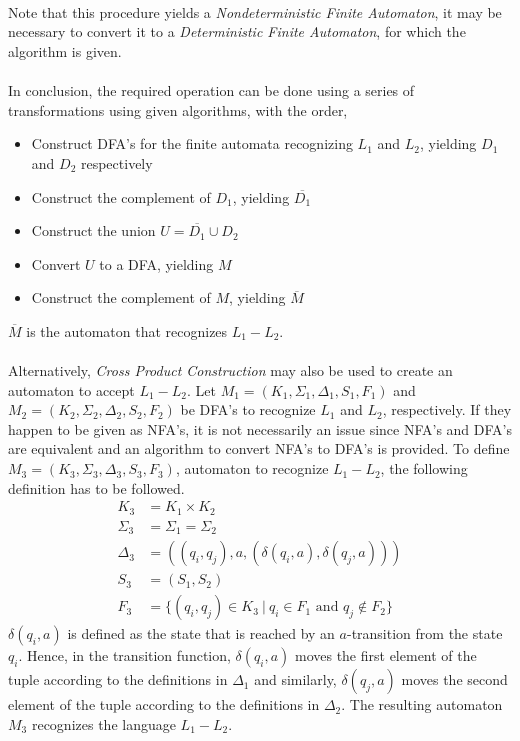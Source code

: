 \documentclass[12pt]{article}
\begin{document}
~\\
\\~\\
Note that this procedure yields a \textit{Nondeterministic Finite Automaton}, it may be necessary to convert it to a \textit{Deterministic Finite Automaton}, for which the algorithm is given.\\~\\
In conclusion, the required operation can be done using a series of transformations using given algorithms, with the order,
\begin{itemize}
    \item Construct DFA's for the finite automata recognizing $L_1$ and $L_2$, yielding $D_1$ and $D_2$ respectively
    \item Construct the complement of $D_1$, yielding $\overline{D_1}$
    \item Construct the union $U=\overline{D_1}\cup D_2$
    \item Convert $U$ to a DFA, yielding $M$
    \item Construct the complement of $M$, yielding $\overline M$
\end{itemize}
$\overline M$ is the automaton that recognizes $L_1-L_2$.\\~\\
Alternatively, \textit{Cross Product Construction} may also be used to create an automaton to accept $L_1-L_2$. Let $M_1=(K_1,\Sigma_1,\Delta_1,S_1,F_1)$ and $M_2=(K_2,\Sigma_2,\Delta_2,S_2,F_2)$ be DFA's to recognize $L_1$ and $L_2$, respectively. If they happen to be given as NFA's, it is not necessarily an issue since NFA's and DFA's are equivalent and an algorithm to convert NFA's to DFA's is provided. To define $M_3=(K_3,\Sigma_3,\Delta_3,S_3,F_3)$, automaton to recognize $L_1-L_2$, the following definition has to be followed.\\
\begin{align*}
    K_3 &= K_1 \times K_2 \\
    \Sigma_3 &= \Sigma_1 = \Sigma_2\\
    \Delta_3 &= ((q_i,q_j), a, (\delta(q_i,a),\delta(q_j,a)))\\
    S_3 &= (S_1,S_2)\\
    F_3 &= \{(q_i,q_j)\in K_3~|~q_i\in F_1 \text{ and } q_j\notin F_2\} 
\end{align*}
$\delta(q_i,a)$ is defined as the state that is reached by an $a$-transition from the state $q_i$. Hence, in the transition function, $\delta(q_i,a)$ moves the first element of the tuple according to the definitions in $\Delta_1$ and similarly, $\delta(q_j,a)$ moves the second element of the tuple according to the definitions in $\Delta_2$. The resulting automaton $M_3$ recognizes the language $L_1-L_2$.
\end{document}
